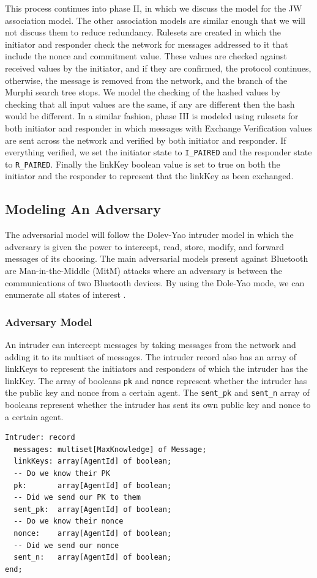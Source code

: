 \documentclass{acm_proc_article-sp}
\begin{document}
This process continues into phase II, in which we discuss the model for the JW association model. The other association models are similar enough that we will not discuss them to reduce redundancy. Rulesets are created in which the initiator and responder check the network for messages addressed to it that include the nonce and commitment value. These values are checked against received values by the initiator, and if they are confirmed, the protocol continues, otherwise, the message is removed from the network, and the branch of the Murphi search tree stops. We model the checking of the hashed values by checking that all input values are the same, if any are different then the hash would be different. In a similar fashion, phase III is modeled using rulesets for both initiator and responder in which messages with Exchange Verification values are sent across the network and verified by both initiator and responder. If everything verified, we set the initiator state to \texttt{I\_PAIRED} and the responder state to \texttt{R\_PAIRED}. Finally the linkKey boolean value is set to true on both the initiator and the responder to represent that the linkKey as been exchanged.

\subsection{Modeling An Adversary}
The adversarial model will follow the Dolev-Yao intruder model \cite{dolev:yao} in which the adversary is given the power to intercept, read, store, modify, and forward messages of its choosing. The main adversarial models present against Bluetooth are Man-in-the-Middle (MitM) attacks where an adversary is between the communications of two Bluetooth devices. By using the Dole-Yao mode, we can enumerate all states of interest \cite{dolev:yao}.

\subsubsection{Adversary Model}
An intruder can intercept messages by taking messages from the network and adding it to its multiset of messages. The intruder record also has an array of linkKeys to represent the initiators and responders of which the intruder has the linkKey. The array of booleans \texttt{pk} and \texttt{nonce} represent whether the intruder has the public key and nonce from a certain agent. The \texttt{sent\_pk} and \texttt{sent\_n} array of booleans represent whether the intruder has sent its own public key and nonce to a certain agent.
\begin{verbatim}
Intruder: record 
  messages: multiset[MaxKnowledge] of Message;
  linkKeys: array[AgentId] of boolean;
  -- Do we know their PK
  pk:       array[AgentId] of boolean;
  -- Did we send our PK to them
  sent_pk:  array[AgentId] of boolean;
  -- Do we know their nonce
  nonce:    array[AgentId] of boolean;
  -- Did we send our nonce
  sent_n:   array[AgentId] of boolean;
end;
\end{verbatim}
\end{document}
